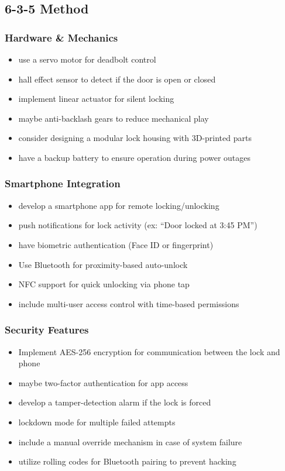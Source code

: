 
\subsection{6-3-5 Method}
\subsubsection{Hardware \& Mechanics}
\begin{itemize}
    \item use a servo motor for deadbolt control
    \item hall effect sensor to detect if the door is open or closed
    \item implement linear actuator for silent locking
    \item maybe anti-backlash gears to reduce mechanical play
    \item consider designing a modular lock housing with 3D-printed parts
    \item have a backup battery to ensure operation during power outages
\end{itemize}

\subsubsection{Smartphone Integration}
\begin{itemize}
    \item develop a smartphone app for remote locking/unlocking
    \item push notifications for lock activity (ex: ``Door locked at 3:45 PM'')
    \item have biometric authentication (Face ID or fingerprint)
    \item Use Bluetooth for proximity-based auto-unlock
    \item NFC support for quick unlocking via phone tap
    \item include multi-user access control with time-based permissions
\end{itemize}

\subsubsection{Security Features}
\begin{itemize}
    \item Implement AES-256 encryption for communication between the lock and phone
    \item maybe two-factor authentication for app access
    \item develop a tamper-detection alarm if the lock is forced
    \item lockdown mode for multiple failed attempts
    \item include a manual override mechanism in case of system failure
    \item utilize rolling codes for Bluetooth pairing to prevent hacking
\end{itemize}

